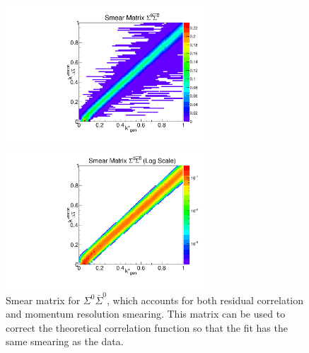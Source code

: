 \begin{figure}[ht]
\begin{minipage}{17.5pc}
\includegraphics[width=17.5pc]{Figures/SmearMatrices/2016-7-19-SmearMatrixSigmaSigmaNormLA.pdf}
\end{minipage}\hspace{0.5pc}
\begin{minipage}{17.5pc}
\includegraphics[width=17.5pc]{Figures/SmearMatrices/2016-7-19-SmearMatrixSigmaSigmaNormLALog.pdf}
\end{minipage} 
\caption[Smear matrix -- $\Sigma^0\bar{\Sigma}^0$]{
Smear matrix for $\Sigma^0\bar{\Sigma}^0$, which accounts for both residual correlation and momentum resolution smearing. This matrix can be used to correct the theoretical correlation function so that the fit has the same smearing as the data.
}
\end{figure}


